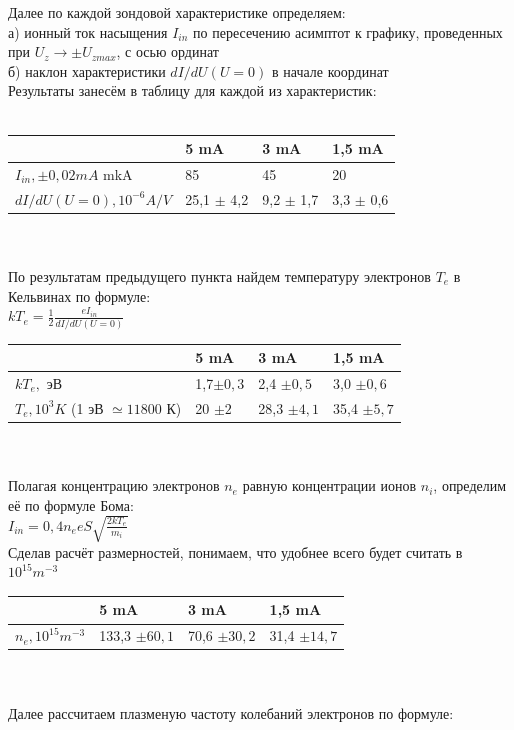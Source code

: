 \documentclass[11pt]{article}
\begin{document}
Далее по каждой зондовой характеристике определяем:\\
а) ионный ток насыщения $I_{in}$ по пересечению асимптот к графику, проведенных при $U_{z} \rightarrow \pm U_{zmax}$, с осью ординат\\
б) наклон характеристики $dI/dU(U = 0)$ в начале координат\\
Результаты занесём в таблицу для каждой из характеристик:\\
\\
\begin{tabular}{|l|l|l|l|}
\hline
 & 5 mA & 3 mA & 1,5 mA\\
\hline
$I_{in}, \pm 0,02 mA$ mkA& 85 &45 &20
\\
\hline
$dI/dU(U = 0), 10^{-6} A/V$ & 25,1 $\pm$ 4,2 & 9,2 $\pm$ 1,7 & 3,3 $\pm$ 0,6
\\
\hline
\end{tabular}
\\
\\
По результатам предыдущего пункта найдем температуру электронов $T_{e}$ в Кельвинах по формуле:\\
$ kT_{e} = \frac{1}{2}\frac{eI_{in}}{dI/dU(U = 0)}$\\
\begin{tabular}{|l|l|l|l|}
\hline
 & 5 mA & 3 mA & 1,5 mA\\
\hline
$kT_{e}, $ эВ & 1,7$\pm 0,3$ & 2,4 $\pm 0,5$ & 3,0 $\pm 0,6$
\\
\hline
$T_{e}, 10^3 K $ (1 эВ $\simeq 11800$ К) & 20 $\pm 2$ & 28,3 $ \pm 4,1$ & 35,4 $\pm 5,7$
\\
\hline
\end{tabular}
\\
\\
Полагая концентрацию электронов $n_e$ равную концентрации ионов $n_i$, определим её по формуле Бома:\\
$I_{in} = 0,4n_{e}eS\sqrt{\frac{2kT_{e}}{m_{i}}}$\\
Сделав расчёт размерностей, понимаем, что удобнее всего будет считать в $10^{15} m^{-3} $\\
\begin{tabular}{|l|l|l|l|}
\hline
 & 5 mA & 3 mA & 1,5 mA\\
\hline
$n_{e}, 10^{15} m^{-3}$ & 133,3 $\pm 60,1 $& 70,6 $\pm 30,2$ & 31,4 $\pm 14,7$
\\
\hline
\end{tabular}
\\
\\
Далее рассчитаем плазменую частоту колебаний электронов по формуле:\\
\end{document}
